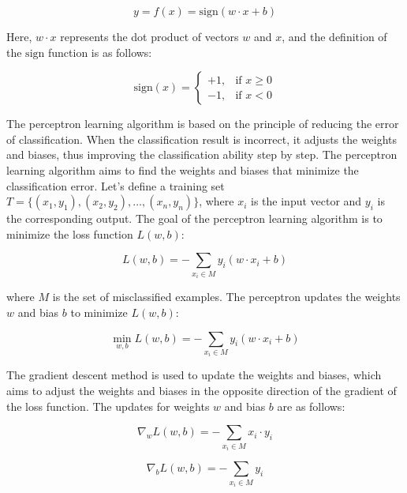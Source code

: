 \documentclass[paper=a4, fontsize=11pt]{scrartcl} %
\numberwithin{equation}{section} %
\numberwithin{figure}{section} %
\numberwithin{table}{section} %
\begin{document}
\begin{equation}
    y = f(x) = \text{sign}(w \cdot x + b)
\end{equation}

Here, \( w \cdot x \) represents the dot product of vectors \( w \) and \( x \), and the definition of the \( \text{sign} \) function is as follows:

\begin{equation}
    \text{sign}(x) = 
\begin{cases}
+1, & \text{if } x \geq 0 \\
-1, & \text{if } x < 0
\end{cases}
\end{equation}


The perceptron learning algorithm is based on the principle of reducing the error of classification. When the classification result is incorrect, it adjusts the weights and biases, thus improving the classification ability step by step. The perceptron learning algorithm aims to find the weights and biases that minimize the classification error. Let's define a training set \( T = \{(x_1, y_1), (x_2, y_2), \ldots, (x_n, y_n)\} \), where \( x_i \) is the input vector and \( y_i \) is the corresponding output. The goal of the perceptron learning algorithm is to minimize the loss function \( L(w,b) \):

\begin{equation}
L(w,b) = - \sum_{x_i \in M} y_i (w \cdot x_i + b)
\end{equation}

where \( M \) is the set of misclassified examples. The perceptron updates the weights \( w \) and bias \( b \) to minimize \( L(w,b) \):

\begin{equation}
\min_{w,b} L(w,b) = - \sum_{x_i \in M} y_i (w \cdot x_i + b)
\end{equation}

The gradient descent method is used to update the weights and biases, which aims to adjust the weights and biases in the opposite direction of the gradient of the loss function. The updates for weights \( w \) and bias \( b \) are as follows:

\begin{equation}
\nabla_w L(w,b) = - \sum_{x_i \in M} x_i \cdot y_i
\end{equation}

\begin{equation}
\nabla_b L(w,b) = - \sum_{x_i \in M} y_i
\end{equation}
\end{document}
